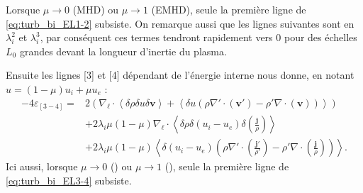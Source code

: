 Lorsque $\mu \rightarrow 0$ (\ac{MHD}) ou $\mu \rightarrow 1$ (\acs{EMHD}), seule la première ligne de \eqref{eq:turb_bi_EL1-2} subsiste. On remarque aussi que les lignes suivantes sont en $\lambda_i^2$ et $\lambda_i^3$, par conséquent ces termes tendront rapidement vers 0 pour des échelles $L_0$ grandes devant la longueur d'inertie du plasma. 

 Ensuite les lignes [3] et [4] dépendant de l'énergie interne nous donne, en notant $u = \left(1-\mu\right)u_i + \mu u_e$ : 
\begin{equation}\begin{array}{rl}\label{eq:turb_bi_EL3-4}%
  - 4  \varepsilon_{[3-4]} 
 =& 2  \left( \nabla_{\boldsymbol{\ell}} \cdot\left<  \delta \rho  \delta u \delta \boldsymbol{v} \right> +\left<\delta u  \left(\rho \nabla' \cdot \left(\boldsymbol{v'} \right)- \rho' \nabla \cdot \left(\boldsymbol{v}  \right)\right)\right> \right) \\%
  &+ 2 \lambda_i \mu\left(1-\mu\right) \nabla_{\boldsymbol{\ell}} \cdot\left<  \delta \rho  \delta \left(u_i-u_e\right) \delta \left(  \frac{\boldsymbol{j}}{\rho} \right)\right> \\ %
  &+ 2  \lambda_i \mu\left(1-\mu\right)\left<\delta \left(u_i-u_e\right)  \left(\rho \nabla' \cdot \left(  \frac{\boldsymbol{j'}}{\rho'} \right)- \rho' \nabla \cdot \left(\frac{\boldsymbol{j}}{\rho} \right)\right)\right> .
\end{array}\end{equation}%
Ici aussi, lorsque $\mu \rightarrow 0$ () ou $\mu \rightarrow 1$ (), seule la première ligne de  \eqref{eq:turb_bi_EL3-4} subsiste.

